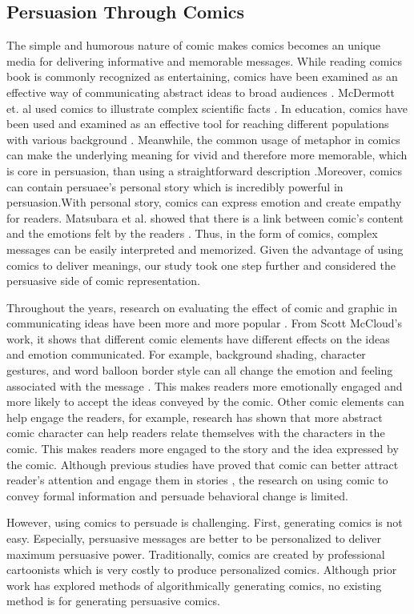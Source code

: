 \subsection{Persuasion Through Comics}
The simple and humorous nature of comic makes comics becomes an unique media for delivering informative and memorable messages. While reading comics book is commonly recognized as entertaining, comics have been examined as an effective way of communicating abstract ideas to broad audiences \cite{McDermottPB18,cary2004going,scott1993understanding}. McDermott et. al used comics to illustrate complex scientific facts \cite{McDermottPB18}. In education, comics have been used and examined as an effective tool for reaching different populations with various background \cite{McDermottPB18,cary2004going,scott1993understanding}. Meanwhile, the common usage of metaphor in comics can make the underlying meaning for vivid and therefore more memorable, which is core in persuasion, than using a straightforward description \cite{McDermottPB18,scott1993understanding}.Moreover, comics can contain persuaee's personal story which is incredibly powerful in persuasion\cite{weaver2017losing}.With personal story, comics can express emotion and create empathy for readers. Matsubara et al. showed that there is a link between comic's content and the emotions felt by the readers \cite{matsubara2016emotional}. Thus, in the form of comics, complex messages can be easily interpreted and memorized. Given the advantage of using comics to deliver meanings, our study took one step further and considered the persuasive side of comic representation.

Throughout the years, research on evaluating the effect of comic and graphic in communicating ideas have been more and more popular \cite{McDermottPB18,cary2004going,scott1993understanding,weaver2017losing,matsubara2016emotional}. From Scott McCloud's work, it shows that different comic elements have different effects on the ideas and emotion communicated. For example, background shading, character gestures, and word balloon border style can all change the emotion and feeling associated with the message \cite{scott1993understanding,mccloud2011making}. This makes readers more emotionally engaged and more likely to accept the ideas conveyed by the comic. Other comic elements can help engage the readers, for example, research has shown that more abstract comic character can help readers relate themselves with the characters in the comic. This makes readers more engaged to the story and the idea expressed by the comic. Although previous studies have proved that comic can better attract reader's attention and engage them in stories \cite{scott1993understanding,mccloud2011making,McDermottPB18}, the research on using comic to convey formal information and persuade behavioral change is limited.

However, using comics to persuade is challenging. First, generating comics is not easy. Especially, persuasive messages are better to be personalized to deliver maximum persuasive power. Traditionally, comics are created by professional cartoonists which is very costly to produce personalized comics.  Although prior work has explored methods of algorithmically generating comics, no existing method is for generating persuasive comics.
